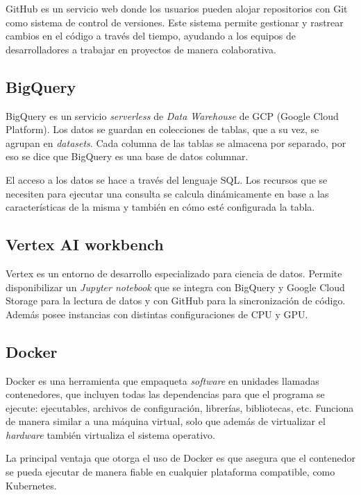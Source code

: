 GitHub es un servicio web donde los usuarios pueden alojar repositorios con Git como sistema de control de versiones. Este sistema permite gestionar y rastrear cambios en el código a través del tiempo, ayudando a los equipos de desarrolladores a trabajar en proyectos de manera colaborativa.

\subsection{BigQuery}
\label{cap2-bq}

BigQuery es un servicio \textit{serverless} de \textit{Data Warehouse} de GCP (Google Cloud Platform). Los datos se guardan en colecciones de tablas, que a su vez, se agrupan en \textit{datasets}. Cada columna de las tablas se almacena por separado, por eso se dice que BigQuery es una base de datos columnar.

El acceso a los datos se hace a través del lenguaje SQL. Los recursos que se necesiten para ejecutar una consulta se calcula dinámicamente en base a las características de la misma y también en cómo esté configurada la tabla.

\subsection{Vertex AI workbench}

Vertex es un entorno de desarrollo especializado para ciencia de datos. Permite disponibilizar un \textit{Jupyter notebook} que se integra con BigQuery y Google Cloud Storage para la lectura de datos y con GitHub para la sincronización de código. Además posee instancias con distintas configuraciones de CPU y GPU. 

\subsection{Docker}

Docker es una herramienta que empaqueta \textit{software} en unidades llamadas contenedores, que incluyen todas las dependencias para que el programa se ejecute: ejecutables, archivos de configuración, librerías, bibliotecas, etc. Funciona de manera similar a una máquina virtual, solo que además de virtualizar el \textit{hardware} también virtualiza el sistema operativo.

La principal ventaja que otorga el uso de Docker es que asegura que el contenedor se pueda ejecutar de manera fiable en cualquier plataforma compatible, como Kubernetes.

